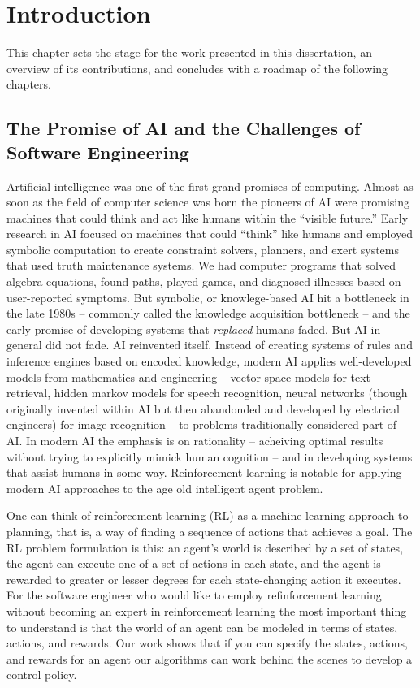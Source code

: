 \chapter{Introduction}

This chapter sets the stage for the work presented in this dissertation, an overview of its contributions, and concludes with a roadmap of the following chapters.

\section{The Promise of AI and the Challenges of Software Engineering}

Artificial intelligence was one of the first grand promises of computing. Almost as soon as the field of computer science was born the pioneers of AI were promising machines that could think and act like humans within the ``visible future.'' Early research in AI focused on machines that could ``think'' like humans and employed symbolic computation to create constraint solvers, planners, and exert systems that used truth maintenance systems. We had computer programs that solved algebra equations, found paths, played games, and diagnosed illnesses based on user-reported symptoms. But symbolic, or knowlege-based AI hit a bottleneck in the late 1980s -- commonly called the knowledge acquisition bottleneck -- and the early promise of developing systems that {\it replaced} humans faded. But AI in general did not fade. AI reinvented itself. Instead of creating systems of rules and inference engines based on encoded knowledge, modern AI applies well-developed models from mathematics and engineering -- vector space models for text retrieval, hidden markov models for speech recognition, neural networks (though originally invented within AI but then abandonded and developed by electrical engineers) for image recognition -- to problems traditionally considered part of AI. In modern AI the emphasis is on rationality -- acheiving optimal results without trying to explicitly mimick human cognition -- and in developing systems that assist humans in some way. Reinforcement learning is notable for applying modern AI approaches to the age old intelligent agent problem.

One can think of reinforcement learning (RL) as a machine learning approach to planning, that is, a way of finding a sequence of actions that achieves a goal.  The RL problem formulation is this: an agent's world is described by a set of states, the agent can execute one of a set of actions in each state, and the agent is rewarded to greater or lesser degrees for each state-changing action it executes. For the software engineer who would like to employ refinforcement learning without becoming an expert in reinforcement learning the most important thing to understand is that the world of an agent can be modeled in terms of states, actions, and rewards. Our work shows that if you can specify the states, actions, and rewards for an agent our algorithms can work behind the scenes to develop a control policy.

